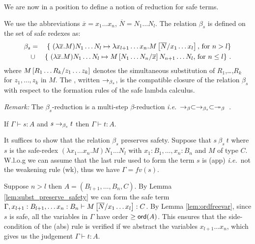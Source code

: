 We are now in a position to define a notion of reduction for safe terms.

\begin{definition}\rm
\label{dfn:safereduction} We use the
abbreviations $\overline{x} = x_1 \ldots x_n$,
$\overline{N} = N_1 \ldots N_l$.
The relation $\beta_s$ is defined on the set of safe redexes as:
\begin{eqnarray*}
  \beta_s &=&
  \{  \ (\lambda \overline{x} . M) N_1 \ldots N_l \mapsto \lambda x_{l+1} \ldots x_n. M\left[ \overline{N}/x_1 \ldots x_l \right] \mbox{, for $n> l$}
  \} \\
  &\cup&
  \{ \ (\lambda \overline{x}  . M) N_1 \ldots N_l \mapsto M\left[ N_1 \ldots N_n/\overline{x} \right] N_{n+1} \ldots N_l
  \mbox{, for $n\leq l$} \} \ .
\end{eqnarray*}
where $M\left[ R_1 \ldots R_k/z_1 \ldots z_k \right]$ denotes the simultaneous substitution of $R_1$,\ldots,$R_k$ for $z_1, \ldots, z_k$ in $M$.  The
, written $\rightarrow_{\beta_s}$, is the
compatible closure of the relation $\beta_s$ with respect to the
formation rules of the safe lambda calculus.
\end{definition}

\noindent \emph{Remark:} The $\beta_s$-reduction is a multi-step
$\beta$-reduction {\it i.e.}~$\rightarrow_\beta \subset \rightarrow_{\beta_s} \subset
\twoheadrightarrow_\beta$\ .


\begin{lemma}
\label{lem:safered_preserve_safety}
If $\Gamma \vdash s :A$ and $s \rightarrow_{\beta_s} t$ then $\Gamma \vdash t :A$.
\end{lemma}

\proof
  It suffices to show that the relation $\beta_s$ preserves safety.
Suppose that $s\ \beta_s\ t$ where $s$ is the
safe-redex $(\lambda x_1 \ldots x_n . M) N_1
  \ldots N_l $ with $x_1 : B_1, \ldots, x_n: B_n$
and $M$ of type $C$.  W.l.o.g we can assume that the last rule   used to form the term $s$ is {\sf(app)} {\it i.e.}~not the weakening rule {\sf(wk)}, thus  we have $\Gamma = fv(s)$.

Suppose $n>l$ then $A = (B_{l+1}, \ldots, B_n, C)$. By Lemma \ref{lem:subst_preserve_safety} we can form the safe term %
$\Gamma, x_{l+1}:B_{l+1}, \ldots x_n :B_{n}\vdash M\left[ \overline{N}/x_1 \ldots x_l \right] : C$. %
By Lemma \ref{lem:ordfreevar}, since $s$ is safe, all the variables in $\Gamma$ have order $\geq {\sf ord}(A)$. This ensures that the side-condition of the {\sf(abs)} rule is verified if we abstract the variables $x_{l+1} \ldots x_n$, which gives us the judgement $\Gamma \vdash t :A$.

